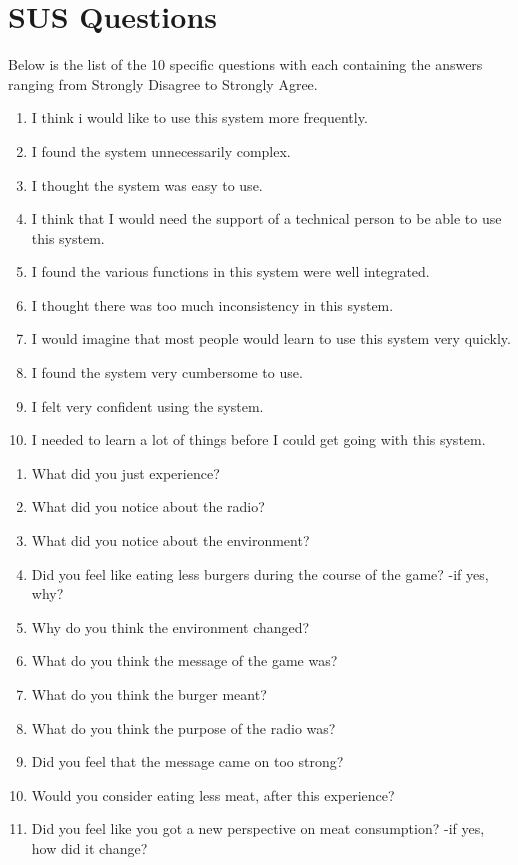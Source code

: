 \renewcommand{\thesection}{\Alph{section}}

\section{SUS Questions}\label{SUS}
Below is the list of the 10 specific questions with each containing the answers ranging from Strongly Disagree to Strongly Agree. 

\begin{enumerate}
    \item I think i would like to use this system more frequently.
    \item I found the system unnecessarily complex.
    \item I thought the system was easy to use.
    \item I think that I would need the support of a technical person to be able to use this system.
    \item I found the various functions in this system were well integrated.
    \item I thought there was too much inconsistency in this system.
    \item I would imagine that most people would learn to use this system very quickly.
    \item I found the system very cumbersome to use.
    \item I felt very confident using the system.
    \item I needed to learn a lot of things before I could get going with this system.
\end{enumerate}


\begin{enumerate}\label{FinalTestQuestions}
    \item What did you just experience?
    \item What did you notice about the radio?
    \item What did you notice about the environment?
    \item Did you feel like eating less burgers during the course of the game? -if yes, why?
    \item Why do you think the environment changed?
    \item What do you think the message of the game was?
    \item What do you think the burger meant?
    \item What do you think the purpose of the radio was?
    \item Did you feel that the message came on too strong?
    \item Would you consider eating less meat, after this experience?
    \item Did you feel like you got a new perspective on meat consumption? -if yes, how did it change?
\end{enumerate}